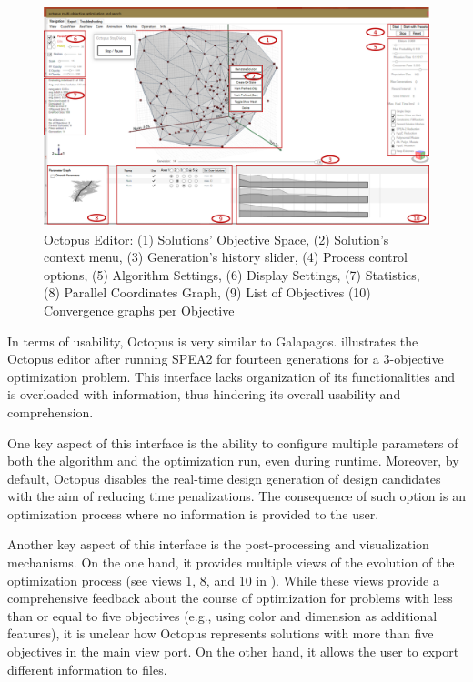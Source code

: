 \begin{figure}
\centering
\includegraphics[width=1\textwidth]{Images/Background/Octopus/octopus-menu.png}
\caption[Octopus optimization plug-in Editor]{Octopus Editor: (1) Solutions' Objective Space, (2) Solution's context menu, (3) Generation's history slider, (4) Process control options, (5) Algorithm Settings, (6) Display Settings, (7) Statistics, (8) Parallel Coordinates Graph, (9) List of Objectives (10) Convergence graphs per Objective}
\label{fig:octopus}
\end{figure}

In terms of usability, Octopus is very similar to Galapagos.  illustrates the Octopus editor after running \ac{SPEA2} for fourteen generations for a 3-objective optimization problem. This interface lacks organization of its functionalities and is overloaded with information, thus hindering its overall usability and comprehension.

One key aspect of this interface is the ability to configure multiple parameters of both the algorithm and the optimization run, even during runtime. Moreover, by default, Octopus disables the real-time design generation of design candidates with the aim of reducing time penalizations. The consequence of such option is an optimization process where no information is provided to the user.

Another key aspect of this interface is the post-processing and visualization mechanisms. On the one hand, it provides multiple views of the evolution of the optimization process (see views 1, 8, and 10 in ). While these views provide a comprehensive feedback about the course of optimization for problems with less than or equal to five objectives (e.g., using color and dimension as additional features), it is unclear how Octopus represents solutions with more than five objectives in the main view port. On the other hand, it allows the user to export different information to files. 

